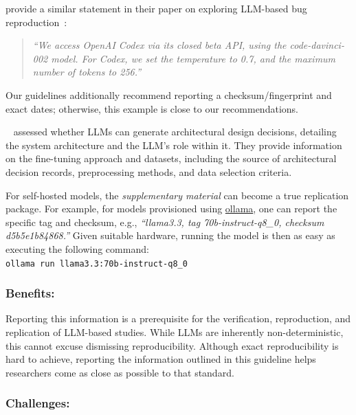 \documentclass[smallextended]{svjour3}
\newcommand{\supplementarymaterial}{\emph{supplementary material}\xspace}
\newcommand{\supplementarymaterial}{\emph{supplementary material}\xspace}
\newcommand{\guidelinesubsubsection}[1]{\subsubsection{\bfseries #1:}}
\newcommand{\guidelinesubsubsection}[1]{\subsubsection{#1}}
\begin{document}
\citeauthor{DBLP:conf/icse/KangYY23} provide a similar statement in their paper on exploring LLM-based bug reproduction~\cite{DBLP:conf/icse/KangYY23}:

\begin{quote}
\it
``We access OpenAI Codex via its closed beta API, using the code-davinci-002 model. For Codex, we set the temperature to 0.7, and the maximum number of tokens to 256.''
\end{quote}

Our guidelines additionally recommend reporting a checksum/fingerprint and exact dates; otherwise, this example is close to our recommendations.

\citeauthor{DBLP:conf/icsa/DharVV24}~\cite{DBLP:conf/icsa/DharVV24} assessed whether LLMs can generate architectural design decisions, detailing the system architecture and the LLM's role within it.
They provide information on the fine-tuning approach and datasets, including the source of architectural decision records, preprocessing methods, and data selection criteria.

For self-hosted models, the \supplementarymaterial can become a true replication package. For example, for models provisioned using \href{https://ollama.com/library/}{ollama}, one can report the specific tag and checksum, e.g., \emph{``llama3.3, tag 70b-instruct-q8\_0, checksum d5b5e1b84868.''}
Given suitable hardware, running the model is then as easy as executing the following command:\\
\texttt{ollama run llama3.3:70b-instruct-q8\_0}

\guidelinesubsubsection{Benefits}

Reporting this information is a prerequisite for the verification, reproduction, and replication of LLM-based studies. While LLMs are inherently non-deterministic, this cannot excuse dismissing reproducibility. Although exact reproducibility is hard to achieve, reporting the information outlined in this guideline helps researchers come as close as possible to that standard.

\guidelinesubsubsection{Challenges}
\end{document}
